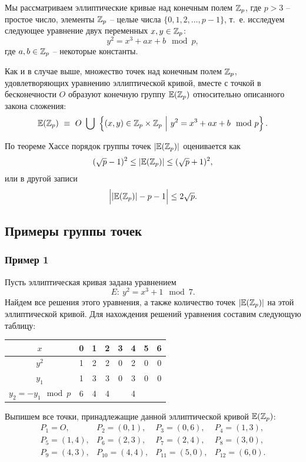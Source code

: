 Мы рассматриваем эллиптические кривые над конечным полем $\mathbb{Z}_p$, где $p > 3$ -- простое число, элементы $\mathbb{Z}_p$ -- целые числа $\{0, 1, 2,  \ldots, p-1\}$, т.~е. исследуем следующее уравнение двух переменных $x, y \in \mathbb{Z}_p$:
    \[ y^2 = x^3 + a x + b \mod p, \]
где $a, b \in \mathbb{Z}_p$ -- некоторые константы.

Как и в случае выше, множество точек над конечным полем $\mathbb{Z}_p$, удовлетворяющих уравнению эллиптической кривой, вместе с точкой в бесконечности $O$ образуют конечную группу $\mathbb{E}(\mathbb{Z}_p)$ относительно описанного закона сложения:
    \[ \mathbb{E}(\mathbb{Z}_p) ~ \equiv~  O ~ \bigcup ~
        \left\{ (x, y) \in \mathbb{Z}_p \times \mathbb{Z}_p ~\Big|~ y^2 = x^3 + a x + b \mod p \right\}. \]

По теореме Хассе порядок группы точек $|\mathbb{E}(\mathbb{Z}_p)|$ оценивается как
    \[ (\sqrt{p}-1)^2 \leq |\mathbb{E}(\mathbb{Z}_p)| \leq (\sqrt{p}+1)^2, \]
или в другой записи
    \[ \Big| |\mathbb{E}(\mathbb{Z}_p)| - p - 1 \Big| \le 2 \sqrt{p}. \]

\subsection{Примеры группы точек}

\subsubsection{Пример 1}

Пусть эллиптическая кривая задана уравнением
    \[ E: ~ y^2 = x^3 + 1 \mod 7. \]
Найдем все решения этого уравнения, а также количество точек $|\mathbb{E}(\mathbb{Z}_p)|$ на этой эллиптической кривой. Для нахождения решений уравнения составим следующую таблицу:

\begin{center} \begin{tabular}{|c|c|c|c|c|c|c|c|}
    \hline
    $x$ & 0 & 1 & 2 & 3 & 4 & 5 & 6 \\
    \hline
    $y^2$ & 1 & 2 & 2 & 0 & 2 & 0 & 0 \\
    \hline
    $y_1$ & 1 & 3 & 3 & 0 & 3 & 0 & 0 \\
    \hline
    $y_2 = - y_1 \mod p$ & 6 & 4 & 4 &   & 4 &   &   \\
    \hline
\end{tabular} \end{center}

Выпишем все точки, принадлежащие данной эллиптической кривой $\mathbb{E}(\mathbb{Z}_p)$:
\[
    \begin{array}{cccc}
        P_1 = O, & P_2 = (0,1), & P_3 = (0,6), & P_4 = (1,3), \\
        P_5 = (1,4), & P_6 = (2,3), & P_7 = (2,4), & P_8 = (3,0), \\
        P_9 = (4,3), & P_{10} = (4,4), & P_{11} = (5,0), & P_{12} = (6,0). \\
    \end{array}
\]

